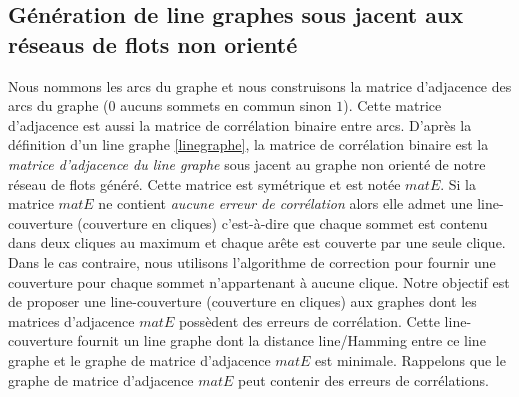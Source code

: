 \documentclass[onecolumn, 12pt]{book}
\begin{document}
\subsection{G\'en\'eration de line graphes sous jacent aux r\'eseaus de flots non orient\'e}
Nous nommons les arcs du graphe et nous construisons la matrice d'adjacence des arcs du graphe ($0$ aucuns sommets en commun sinon $1$). Cette matrice d'adjacence est aussi la matrice de corr\'elation binaire entre arcs. \newline
D'apr\`es la d\'efinition d'un line graphe \ref{linegraphe}, la matrice de corr\'elation binaire est  la {\em matrice d'adjacence du line graphe} sous jacent au graphe non orient\'e de notre r\'eseau de flots g\'en\'er\'e. Cette matrice est sym\'etrique et est not\'ee $matE$.
Si la matrice $matE$ ne contient {\em aucune erreur de corr\'elation} alors elle admet une line-couverture (couverture en cliques) c'est-\`a-dire que chaque sommet est contenu dans deux cliques au maximum et chaque ar\^ete est couverte par une seule clique.
Dans le cas contraire, nous utilisons l'algorithme de correction pour fournir une couverture pour chaque sommet n'appartenant \`a aucune clique. 
\newline
Notre  objectif est de proposer une line-couverture (couverture en cliques) aux graphes dont les matrices d'adjacence $matE$ poss\`edent des erreurs de corr\'elation. Cette line-couverture fournit un line graphe dont 
la distance line/Hamming entre ce line graphe et le graphe de matrice d'adjacence $matE$ est minimale.  Rappelons que le graphe de matrice d'adjacence $matE$ peut contenir des erreurs de corr\'elations.

\end{document}

